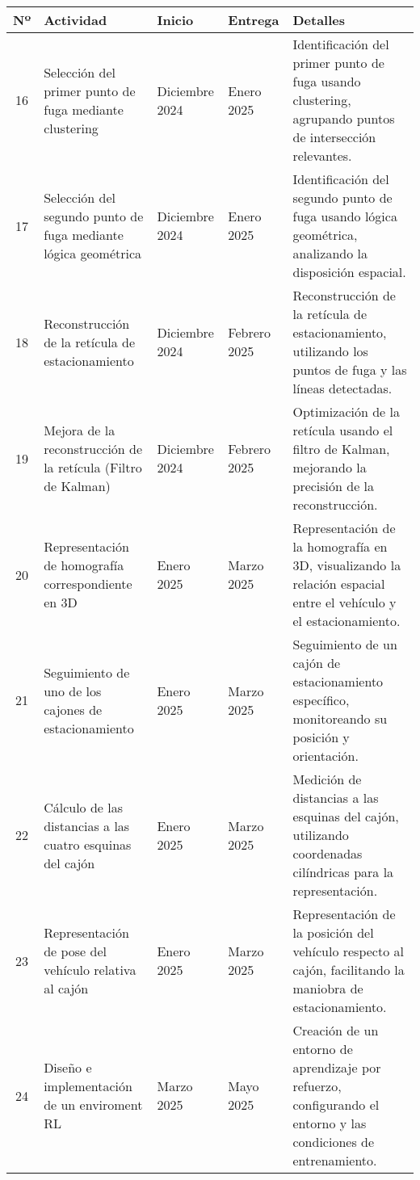     \begin{center}
      \begin{tabularx}{\textwidth}{|c|p{4cm}|p{1cm}|p{1cm}|X|}
        \hline
        \textbf{Nº} & \textbf{Actividad} & \textbf{Inicio} & \textbf{Entrega} & \textbf{Detalles} \\
        \hline
        16 & Selección del primer punto de fuga mediante clustering & Diciembre 2024 & Enero 2025 & Identificación del primer punto de fuga usando clustering, agrupando puntos de intersección relevantes. \\
        \hline
        17 & Selección del segundo punto de fuga mediante lógica geométrica & Diciembre 2024 & Enero 2025 & Identificación del segundo punto de fuga usando lógica geométrica, analizando la disposición espacial. \\
        \hline
        18 & Reconstrucción de la retícula de estacionamiento & Diciembre 2024 & Febrero 2025 & Reconstrucción de la retícula de estacionamiento, utilizando los puntos de fuga y las líneas detectadas. \\
        \hline
        19 & Mejora de la reconstrucción de la retícula (Filtro de Kalman) & Diciembre 2024 & Febrero 2025 & Optimización de la retícula usando el filtro de Kalman, mejorando la precisión de la reconstrucción. \\
        \hline
        20 & Representación de homografía correspondiente en 3D & Enero 2025 & Marzo 2025 & Representación de la homografía en 3D, visualizando la relación espacial entre el vehículo y el estacionamiento. \\
        \hline
        21 & Seguimiento de uno de los cajones de estacionamiento & Enero 2025 & Marzo 2025 & Seguimiento de un cajón de estacionamiento específico, monitoreando su posición y orientación. \\
        \hline
        22 & Cálculo de las distancias a las cuatro esquinas del cajón & Enero 2025 & Marzo 2025 & Medición de distancias a las esquinas del cajón, utilizando coordenadas cilíndricas para la representación. \\
        \hline
        23 & Representación de pose del vehículo relativa al cajón & Enero 2025 & Marzo 2025 & Representación de la posición del vehículo respecto al cajón, facilitando la maniobra de estacionamiento. \\
        \hline
        24 & Diseño e implementación de un enviroment RL & Marzo 2025 & Mayo 2025 & Creación de un entorno de aprendizaje por refuerzo, configurando el entorno y las condiciones de entrenamiento. \\

\end{tabularx}
\end{center}
